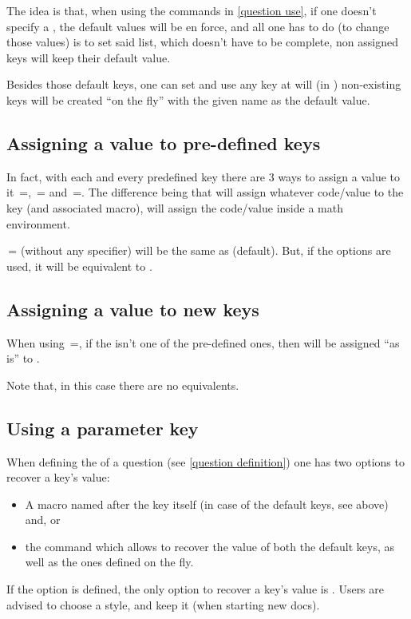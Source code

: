 \documentclass[10pt]{article}
\begin{document}
The idea is that, when using the commands in \ref{question use}, if one doesn't specify a , the default values will be en force, and all one has to do (to change those values) is to set said list, which doesn't have to be complete, non assigned keys will keep their default value.

Besides those default keys, one can set and use any key at will (in ) non-existing keys will be created ``on the fly'' with the given name as the default value.

\subsection{Assigning a value to pre-defined keys}
In fact, with each and every predefined key there are 3 ways to assign a value to it \,=, \,= and \,=. The difference being that  will assign whatever code/value to the key (and associated macro),  will assign the code/value inside a math environment. 
\begin{tsremark}
\,= (without any specifier) will be the same as  (default). But, if the options  are used, it will be equivalent to .
\end{tsremark}

\subsection{Assigning a value to new keys}
When using  \,=, if the  isn't one of the pre-defined ones, then  will be assigned ``as is'' to .
\begin{tsremark}
Note that, in this case there are no  equivalents. 
\end{tsremark}

\subsection{Using a parameter key}
When defining the  of a question (see \ref{question definition}) one has two options to recover a key's value:
\begin{itemize}
  \item A macro named after the key itself (in case of the default keys, see above) and, or
  \item the \tsobj{\QuestVal} command which allows to recover the value of both the default keys, as well as the ones defined on the fly.
\end{itemize}
\begin{tsremark}
If the option  is defined, the only option to recover a key's value is \tsobj{\QuestVal}. Users are advised to choose a style, and keep it (when starting new docs).
\end{tsremark}
\end{document}
